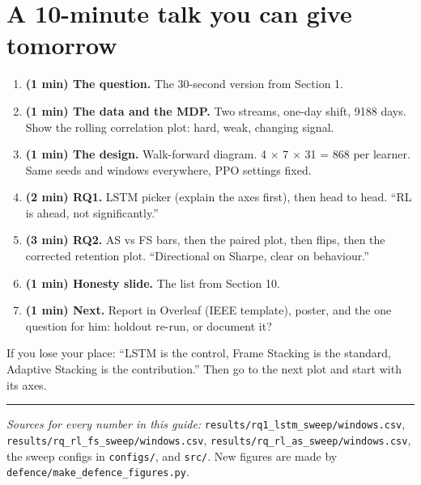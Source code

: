 \documentclass[11pt,a4paper]{article}
\begin{document}
\section{A 10-minute talk you can give tomorrow}

\begin{enumerate}
  \item \textbf{(1 min) The question.} The 30-second version from Section 1.
  \item \textbf{(1 min) The data and the MDP.} Two streams, one-day shift, 9188 days.
        Show the rolling correlation plot: hard, weak, changing signal.
  \item \textbf{(1 min) The design.} Walk-forward diagram. 4 $\times$ 7 $\times$ 31 = 868 per
        learner. Same seeds and windows everywhere, PPO settings fixed.
  \item \textbf{(2 min) RQ1.} LSTM picker (explain the axes first), then head to head.
        ``RL is ahead, not significantly.''
  \item \textbf{(3 min) RQ2.} AS vs FS bars, then the paired plot, then flips, then the corrected
        retention plot. ``Directional on Sharpe, clear on behaviour.''
  \item \textbf{(1 min) Honesty slide.} The list from Section 10.
  \item \textbf{(1 min) Next.} Report in Overleaf (IEEE template), poster, and the one question for
        him: holdout re-run, or document it?
\end{enumerate}

\begin{sayit}
If you lose your place: ``LSTM is the control, Frame Stacking is the standard, Adaptive
Stacking is the contribution.'' Then go to the next plot and start with its axes.
\end{sayit}

\vspace{1em}
\hrule
\small
\textit{Sources for every number in this guide:} \texttt{results/rq1\_lstm\_sweep/windows.csv},
\texttt{results/rq\_rl\_fs\_sweep/windows.csv}, \texttt{results/rq\_rl\_as\_sweep/windows.csv},
the sweep configs in \texttt{configs/}, and \texttt{src/}. New figures are made by
\texttt{defence/make\_defence\_figures.py}.
\end{document}
